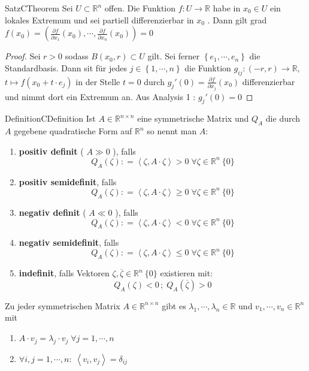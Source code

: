 \begin{ibox}[42]{Satz}{CTheorem}
    Sei $ U \subset \mathbb{R}^n  $ offen. Die Funktion $ f: U \to \mathbb{R}  $ habe in $ x_0 \in U$ ein lokales Extremum und sei 
	partiell differenzierbar in $ x_0 $ . Dann gilt grad $ f \left(x_0\right) = \left( \frac{\partial f}{\partial x_1} \left(x_0\right)
	, \cdots, \frac{\partial f}{\partial x_n} \left(x_0\right)  \right) = 0 $ 
\end{ibox}
\begin{proof}
	Sei $ r>0 $ sodass $ B \left( x_0, r \right) \subset U $ gilt. Sei ferner $ \left\{ e_1 , \cdots, e_n \right\}  $  die 
	Standardbasis. Dann sit für jedes $ j \in  \left\{ 1 , \cdots,  n \right\}  $ die Funktion $ g_{i j}: (-r, r) \to \mathbb{R} , \;$
	$ t \mapsto f \left( x_0 + t \cdot e_j \right)  $ in der Stelle $ t = 0 $ durch $ g_j' \left(0\right)  = 
	\frac{\partial f}{\partial x_j} \left(x_0\right)  $ differenzierbar und nimmt dort ein Extremum an. Aus Analysis 1 : $ g_{j}' 
	\left(0\right)  = 0$  
\end{proof}
\begin{ibox}[]{Definition}{CDefinition}
    Ist $ A \in \mathbb{R} ^{n \times n} $ eine symmetrische Matrix und $ Q_A $ die durch $ A $  gegebene quadratische Form auf 
	$ \mathbb{R}^n  $ so nennt man $ A $: 
	\begin{enumerate}[label=\alph*)]
		\item \textbf{positiv definit} ( $ A \gg 0 $ ), falls 
			$$ Q_{A} \left(\zeta\right) : = \left< \zeta, A \cdot \zeta \right> > 0 \; \forall \zeta \in \mathbb{R}^n \ \{0\} $$
			\item \textbf{positiv semidefinit},  falls 
			$$ Q_{A} \left(\zeta\right) : = \left< \zeta, A \cdot \zeta \right> \geq  0 \; \forall \zeta \in \mathbb{R}^n \ \{0\} $$
	\item \textbf{negativ definit} ( $ A \ll 0 $ ), falls 
			$$ Q_{A} \left(\zeta\right) : = \left< \zeta, A \cdot \zeta \right> < 0 \; \forall \zeta \in \mathbb{R}^n \ \{0\} $$
			\item \textbf{negativ semidefinit},  falls 
			$$ Q_{A} \left(\zeta\right) : = \left< \zeta, A \cdot \zeta \right> \leq  0 \; \forall \zeta \in \mathbb{R}^n \ \{0\} $$
		\item \textbf{indefinit}, falls Vektoren $ \zeta, \overline{ \zeta} \in \mathbb{R}^n \ \{0\} $ existieren mit: 
			$$ Q_{A} \left( \zeta \right) < 0 \, ; \; Q_{A} \left( \overline{ \zeta}  \right) > 0 $$
			
	\end{enumerate}
Zu jeder symmetrischen Matrix $ A \in \mathbb{R}^{n \times n} $ gibt es $ \lambda_1 , \cdots,  \lambda_n \in \mathbb{R}  $ und 
$ v_1 , \cdots,  v_n \in \mathbb{R}^n  $ mit 
\begin{enumerate}[label=\alph*)]
	\item $ A \cdot v_j = \lambda_j \cdot v_j \; \forall j = 1 , \cdots,  n $ 
	\item $ \forall  i,j = 1 , \cdots,  n: \; \left<v_i, v_j \right> = \delta_{i j} $ 
\end{enumerate}
\end{ibox}
